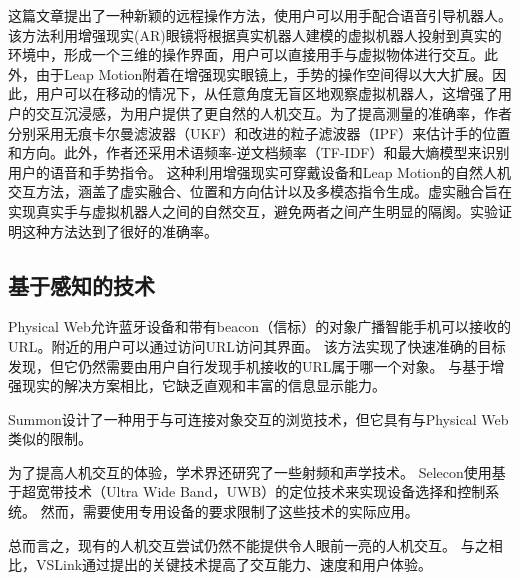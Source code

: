 这篇文章\cite{DuZhaLi19}提出了一种新颖的远程操作方法，使用户可以用手配合语音引导机器人。
该方法利用增强现实(AR)眼镜将根据真实机器人建模的虚拟机器人投射到真实的环境中，形成一个三维的操作界面，用户可以直接用手与虚拟物体进行交互。此外，由于Leap Motion附着在增强现实眼镜上，手势的操作空间得以大大扩展。因此，用户可以在移动的情况下，从任意角度无盲区地观察虚拟机器人，这增强了用户的交互沉浸感，为用户提供了更自然的人机交互。为了提高测量的准确率，作者分别采用无痕卡尔曼滤波器（UKF）和改进的粒子滤波器（IPF）来估计手的位置和方向。此外，作者还采用术语频率-逆文档频率（TF-IDF）和最大熵模型来识别用户的语音和手势指令。
这种利用增强现实可穿戴设备和Leap Motion的自然人机交互方法，涵盖了虚实融合、位置和方向估计以及多模态指令生成。虚实融合旨在实现真实手与虚拟机器人之间的自然交互，避免两者之间产生明显的隔阂。实验证明这种方法达到了很好的准确率。

\subsection{基于感知的技术}
Physical Web\cite{jenson2014physical}允许蓝牙设备和带有beacon（信标）的对象广播智能手机可以接收的URL。附近的用户可以通过访问URL访问其界面。
该方法实现了快速准确的目标发现，但它仍然需要由用户自行发现手机接收的URL属于哪一个对象。
与基于增强现实的解决方案相比，它缺乏直观和丰富的信息显示能力。

Summon\cite{zachariah2020browsing}设计了一种用于与可连接对象交互的浏览技术，但它具有与Physical Web类似的限制。

为了提高人机交互的体验，学术界还研究了一些射频和声学技术\cite{alanwar2017selecon,pu2013whole,mao2016cat}。
Selecon\cite{alanwar2017selecon}使用基于超宽带技术（Ultra Wide Band，UWB）的定位技术来实现设备选择和控制系统。
然而，需要使用专用设备的要求限制了这些技术的实际应用。

总而言之，现有的人机交互尝试仍然不能提供令人眼前一亮的人机交互。
与之相比，VSLink通过提出的关键技术提高了交互能力、速度和用户体验。


